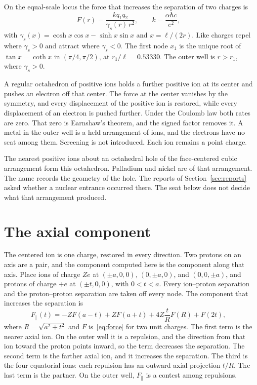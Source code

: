 \documentclass[a4paper]{article}
\begin{document}
On the equal-scale locus the force that increases the separation of two charges is
\begin{equation}
\label{eq:force}
F(r)=\frac{k q_1 q_2}{\gamma_s(r)\,r^{2}},
\qquad
k=\frac{\alpha\hbar c}{e^{2}},
\end{equation}
with \(\gamma_s(x)=\cosh x\cos x-\sinh x\sin x\) and \(x=\ell/(2r)\). Like charges repel where \(\gamma_s>0\) and attract where \(\gamma_s<0\). The first node \(x_1\) is the unique root of \(\tan x=\coth x\) in \((\pi/4,\pi/2)\), at \(r_1/\ell=0.53330\). The outer well is \(r>r_1\), where \(\gamma_s>0\).

A regular octahedron of positive ions holds a further positive ion at its center and pushes an electron off that center. The force at the center vanishes by the symmetry, and every displacement of the positive ion is restored, while every displacement of an electron is pushed further. Under the Coulomb law both rates are zero. That zero is Earnshaw's theorem, and the signed factor removes it. A metal in the outer well is a held arrangement of ions, and the electrons have no seat among them. Screening is not introduced. Each ion remains a point charge.

The nearest positive ions about an octahedral hole of the face-centered cubic arrangement form this octahedron. Palladium and nickel are of that arrangement. The name records the geometry of the hole. The reports of Section~\ref{sec:reports} asked whether a nuclear entrance occurred there. The seat below does not decide what that arrangement produced.

\section{The axial component}
\label{sec:axis}

The centered ion is one charge, restored in every direction. Two protons on an axis are a pair, and the component computed here is the component along that axis. Place ions of charge \(Ze\) at \((\pm a,0,0)\), \((0,\pm a,0)\), and \((0,0,\pm a)\), and protons of charge \(+e\) at \((\pm t,0,0)\), with \(0<t<a\). Every ion--proton separation and the proton--proton separation are taken off every node. The component that increases the separation is
\begin{equation}
\label{eq:axial}
F_{\parallel}(t)
=
-Z F(a-t)+Z F(a+t)
+4Z\frac{t}{R}F(R)
+F(2t),
\end{equation}
where \(R=\sqrt{a^{2}+t^{2}}\) and \(F\) is~\eqref{eq:force} for two unit charges. The first term is the nearer axial ion. On the outer well it is a repulsion, and the direction from that ion toward the proton points inward, so the term decreases the separation. The second term is the farther axial ion, and it increases the separation. The third is the four equatorial ions: each repulsion has an outward axial projection \(t/R\). The last term is the partner. On the outer well, \(F_{\parallel}\) is a contest among repulsions.
\end{document}
